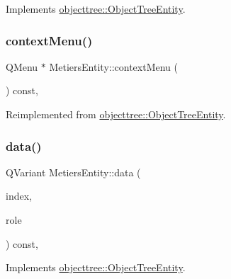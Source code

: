 Implements \mbox{\hyperlink{classobjecttree_1_1_object_tree_entity_a70fd25eccf88b305e9db15fbe3daeae8}{objecttree\+::\+Object\+Tree\+Entity}}.

\mbox{\label{classobjecttree_1_1_metiers_entity_a1cb1d02a1cf0d048589b2b6844d971e8}} 
\subsubsection{\texorpdfstring{contextMenu()}{contextMenu()}}
{\footnotesize\ttfamily Q\+Menu $\ast$ Metiers\+Entity\+::context\+Menu (\begin{DoxyParamCaption}{ }\end{DoxyParamCaption}) const\hspace{0.3cm}{\ttfamily [override]}, {\ttfamily [virtual]}}



Reimplemented from \mbox{\hyperlink{classobjecttree_1_1_object_tree_entity_a0dd10b6074f96af281b6f7a68c492b75}{objecttree\+::\+Object\+Tree\+Entity}}.

\mbox{\label{classobjecttree_1_1_metiers_entity_a87a099389bb77e61ab39707ea1ea9de7}} 
\subsubsection{\texorpdfstring{data()}{data()}}
{\footnotesize\ttfamily Q\+Variant Metiers\+Entity\+::data (\begin{DoxyParamCaption}\item[{const Q\+Model\+Index \&}]{index,  }\item[{int}]{role }\end{DoxyParamCaption}) const\hspace{0.3cm}{\ttfamily [override]}, {\ttfamily [virtual]}}



Implements \mbox{\hyperlink{classobjecttree_1_1_object_tree_entity_a2413c6573de18b451d97eb3800f10f35}{objecttree\+::\+Object\+Tree\+Entity}}.

\mbox{\label{classobjecttree_1_1_metiers_entity_aedf45a5092b676dee0b987a5ec6384d4}} 
